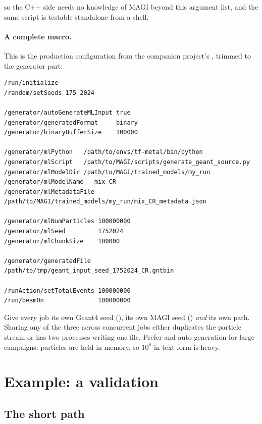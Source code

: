 \documentclass[11pt,a4paper]{article}
\begin{document}
so the C++ side needs no knowledge of MAGI beyond this argument list, and the
same script is testable standalone from a shell.

\paragraph{A complete macro.} This is the production configuration from the
companion project's , trimmed to the generator part:

\begin{lstlisting}[language=shell]
/run/initialize
/random/setSeeds 175 2024

/generator/autoGenerateMLInput true
/generator/generatedFormat     binary
/generator/binaryBufferSize    100000

/generator/mlPython   /path/to/envs/tf-metal/bin/python
/generator/mlScript   /path/to/MAGI/scripts/generate_geant_source.py
/generator/mlModelDir /path/to/MAGI/trained_models/my_run
/generator/mlModelName   mix_CR
/generator/mlMetadataFile /path/to/MAGI/trained_models/my_run/mix_CR_metadata.json

/generator/mlNumParticles 100000000
/generator/mlSeed         1752024
/generator/mlChunkSize    100000

/generator/generatedFile /path/to/tmp/geant_input_seed_1752024_CR.gntbin

/runAction/setTotalEvents 100000000
/run/beamOn               100000000
\end{lstlisting}

\begin{maginote}
Give every job its own Geant4 seed (), its own MAGI seed
() \emph{and} its own 
path. Sharing any of the three across concurrent jobs either duplicates the
particle stream or has two processes writing one file. Prefer 
and auto-generation for large campaigns: particles are held in memory, so
$10^8$ in text form is heavy.
\end{maginote}

\section{Example: a validation}
\label{sec:validation}


\subsection{The short path}
\end{document}
